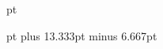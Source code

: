 \XrefSideAlignfalse
\ColNotesfalse
\XrefTopfillfalse


\def\FootNoteRuleLeftIndent{\hskip 0.00 mm}
\def\FootNoteRuleRightIndent{\hss}
\def\FootNoteRuleThickness{0.5 pt}
\def\FootNoteRuleWidth{1.00}
\def\BelowFootNoteRuleSpace{2.0 pt}
 pt

\def\StudyNoteRuleLeftIndent{\hskip 0.00 mm}
\def\StudyNoteRuleRightIndent{\hss}
\def\StudyNoteRuleThickness{0.5 pt}
\def\StudyNoteRuleWidth{1.00}
\def\BelowStudyNoteRuleSpace{2.0 pt}
 pt
\InterNoteSpace=3.5pt
\NoteGutterRulefalse
\JoinGutterRulefalse
\internoteskip=11.667pt plus 13.333pt minus 6.667pt


\def\HeaderPosition{0.835}
\def\FooterPosition{0.308}
\def\RangeSeparator{\kern.1em–\kern.1em} %
\def\ChapterVerseSeparator{\kern.02em:\kern.02em} %
\def\RangeChapSeparator{\kern.1em–\kern.1em}
\def\BookChapSeparator{\ }

\def\RHevenleft{\rangeref}
\def\RHevencenter{\empty}
\def\RHevenright{\empty}

\def\RHoddleft{\empty}
\def\RHoddcenter{\empty}
\def\RHoddright{\rangeref}

\def\RHnoVevenleft{\empty}
\def\RHnoVevencenter{\empty}
\def\RHnoVevenright{\empty}

\def\RHnoVoddleft{\empty}
\def\RHnoVoddcenter{\empty}
\def\RHnoVoddright{\empty}

\VerseRefsfalse               %
\OmitChapterNumberRHfalse   %
\OmitBookReffalse              %

